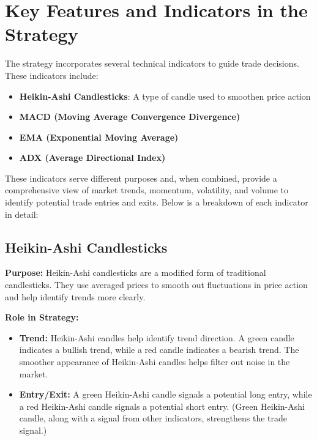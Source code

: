 \documentclass[12pt]{article}
\begin{document}
\section{Key Features and Indicators in the Strategy}

The strategy incorporates several technical indicators to guide trade decisions. These indicators include:

\begin{itemize}
    \item \textbf{Heikin-Ashi Candlesticks}: A type of candle used to smoothen price action
    \item \textbf{MACD (Moving Average Convergence Divergence)}
    \item \textbf{EMA (Exponential Moving Average)}
    \item \textbf{ADX (Average Directional Index)}

\end{itemize}

These indicators serve different purposes and, when combined, provide a comprehensive view of market trends, momentum, volatility, and volume to identify potential trade entries and exits. Below is a breakdown of each indicator in detail:

\subsection{Heikin-Ashi Candlesticks}
\textbf{Purpose:} Heikin-Ashi candlesticks are a modified form of traditional candlesticks. They use averaged prices to smooth out fluctuations in price action and help identify trends more clearly.

\textbf{Role in Strategy:}
\begin{itemize}
    \item \textbf{Trend:} Heikin-Ashi candles help identify trend direction. A green candle indicates a bullish trend, while a red candle indicates a bearish trend. The smoother appearance of Heikin-Ashi candles helps filter out noise in the market.
    \item \textbf{Entry/Exit:} A green Heikin-Ashi candle signals a potential long entry, while a red Heikin-Ashi candle signals a potential short entry. (Green Heikin-Ashi candle, along with a signal from other indicators, strengthens the trade signal.)
\end{itemize}
\end{document}
